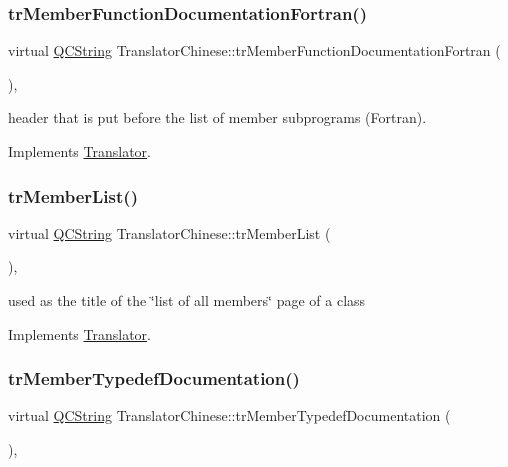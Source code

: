 \subsubsection{\texorpdfstring{trMemberFunctionDocumentationFortran()}{trMemberFunctionDocumentationFortran()}}
{\footnotesize\ttfamily virtual \mbox{\hyperlink{class_q_c_string}{Q\+C\+String}} Translator\+Chinese\+::tr\+Member\+Function\+Documentation\+Fortran (\begin{DoxyParamCaption}{ }\end{DoxyParamCaption})\hspace{0.3cm}{\ttfamily [inline]}, {\ttfamily [virtual]}}

header that is put before the list of member subprograms (Fortran). 

Implements \mbox{\hyperlink{class_translator}{Translator}}.

\mbox{\label{class_translator_chinese_a24a30311c329007ed54d7f98c47aa641}} 
\subsubsection{\texorpdfstring{trMemberList()}{trMemberList()}}
{\footnotesize\ttfamily virtual \mbox{\hyperlink{class_q_c_string}{Q\+C\+String}} Translator\+Chinese\+::tr\+Member\+List (\begin{DoxyParamCaption}{ }\end{DoxyParamCaption})\hspace{0.3cm}{\ttfamily [inline]}, {\ttfamily [virtual]}}

used as the title of the \char`\"{}list of all members\char`\"{} page of a class 

Implements \mbox{\hyperlink{class_translator}{Translator}}.

\mbox{\label{class_translator_chinese_af8165d91f39f03a0368f33c2406707ea}} 
\subsubsection{\texorpdfstring{trMemberTypedefDocumentation()}{trMemberTypedefDocumentation()}}
{\footnotesize\ttfamily virtual \mbox{\hyperlink{class_q_c_string}{Q\+C\+String}} Translator\+Chinese\+::tr\+Member\+Typedef\+Documentation (\begin{DoxyParamCaption}{ }\end{DoxyParamCaption})\hspace{0.3cm}{\ttfamily [inline]}, {\ttfamily [virtual]}}

